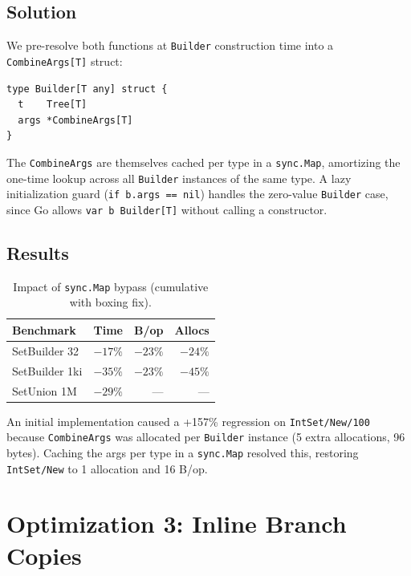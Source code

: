 \documentclass[11pt,twocolumn]{article}
\begin{document}
\subsection{Solution}

We pre-resolve both functions at \texttt{Builder} construction time into a
\texttt{CombineArgs[T]} struct:

\begin{verbatim}
type Builder[T any] struct {
  t    Tree[T]
  args *CombineArgs[T]
}
\end{verbatim}

The \texttt{CombineArgs} are themselves cached per type in a
\texttt{sync.Map}, amortizing the one-time lookup across all
\texttt{Builder} instances of the same type.
A lazy initialization guard (\texttt{if b.args == nil}) handles the
zero-value \texttt{Builder} case, since Go allows
\texttt{var b Builder[T]} without calling a constructor.

\subsection{Results}

\begin{table}[h]
\centering
\caption{Impact of \texttt{sync.Map} bypass (cumulative with boxing fix).}
\label{tab:syncmap}
\begin{tabular}{@{}lrrr@{}}
\toprule
Benchmark & Time & B/op & Allocs \\
\midrule
SetBuilder 32   & $-17\%$ & $-23\%$ & $-24\%$ \\
SetBuilder 1ki  & $-35\%$ & $-23\%$ & $-45\%$ \\
SetUnion 1M     & $-29\%$ & --- & --- \\
\bottomrule
\end{tabular}
\end{table}

An initial implementation caused a +157\% regression on \texttt{IntSet/New/100}
because \texttt{CombineArgs} was allocated per \texttt{Builder} instance (5
extra allocations, 96 bytes).
Caching the args per type in a \texttt{sync.Map} resolved this, restoring
\texttt{IntSet/New} to 1 allocation and 16 B/op.

\section{Optimization 3: Inline Branch Copies}
\label{sec:inline}
\end{document}
